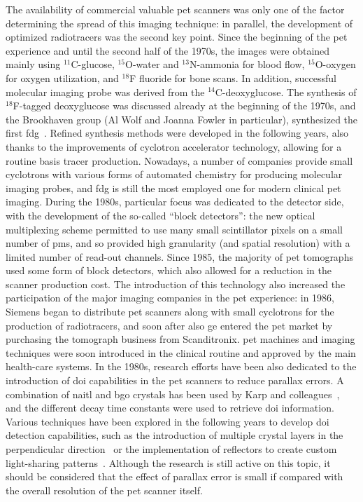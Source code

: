 The availability of commercial valuable \gls{pet} scanners was only one of the factor determining the spread of this imaging technique: in parallel, the development of optimized radiotracers was the second key point. Since the beginning of the \gls{pet} experience and until the second half of the 1970s, the images were obtained mainly using $^{11}$C-glucose, $^{15}$O-water and $^{13}$N-ammonia for blood flow, $^{15}$O-oxygen for oxygen utilization, and $^{18}$F fluoride for bone scans. In addition, successful molecular imaging probe was derived from the $^{14}$C-deoxyglucose. The synthesis of $^{18}$F-tagged deoxyglucose was discussed already at the beginning of the 1970s, and the Brookhaven group (Al Wolf and Joanna Fowler in particular), synthesized the first \gls{fdg}~\parencite{Ido1978}. Refined synthesis methods were developed in the following years, also thanks to the improvements of cyclotron accelerator technology, allowing for a routine basis tracer production. Nowadays, a number of companies provide small cyclotrons with various forms of automated chemistry for producing molecular imaging probes, and \gls{fdg} is still the most employed one for modern clinical \gls{pet} imaging.
During the 1980s, particular focus was dedicated to the detector side, with the development of the so-called \enquote{block detectors}: the new optical multiplexing scheme permitted to use many small scintillator pixels on a small number of \glspl{pm}, and so provided high granularity (and spatial resolution) with a limited number of read-out channels. Since 1985, the majority of \gls{pet} tomographs used some form of block detectors, which also allowed for a reduction in the scanner production cost. The introduction of this technology also increased the participation of the major imaging companies in the \gls{pet} experience: in 1986, Siemens began to distribute \gls{pet} scanners along with small cyclotrons for the production of radiotracers, and soon after also \gls{ge} entered the \gls{pet} market by purchasing the tomograph business from Scanditronix. \gls{pet} machines and imaging techniques were soon introduced in the clinical routine and approved by the main health-care systems. 
In the 1980s, research efforts have been also dedicated to the introduction of \gls{doi} capabilities in the \gls{pet} scanners to reduce parallax errors. A combination of \gls{naitl} and \gls{bgo} crystals has been used by Karp and colleagues~\parencite{Karp1987}, and the different decay time constants were used to retrieve \gls{doi} information. Various techniques have been explored in the following years to develop \gls{doi} detection capabilities, such as the introduction of multiple crystal layers in the perpendicular direction~\parencite{Liu2001} or the implementation of reflectors to create custom light-sharing patterns~\parencite{Murayama1998}. Although the research is still active on this topic, it should be considered that the effect of parallax error is small if compared with the overall resolution of the \gls{pet} scanner itself.
